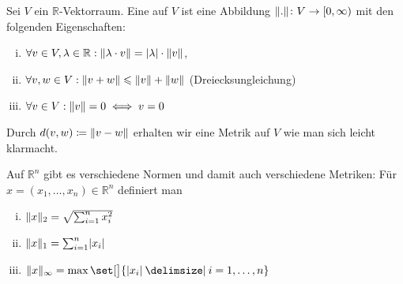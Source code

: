 \begin{definition}[{name=[Vektorraumnorm]}]
	Sei $V$ ein $\mathbb{R}$-Vektorraum.
	Eine  auf $V$ ist eine Abbildung $\Vert.\Vert \colon V \to [0,\infty)$ mit den folgenden Eigenschaften:
	\begin{enumerate}[(i)]
		\item $\forall v \in V, \lambda  \in \mathbb{R} : \Vert\lambda  \cdot v\Vert = \lvert\lambda\rvert  \cdot \Vert v\Vert$,
		\item $\forall v,w \in V : \Vert v+w\Vert \leqslant \Vert v\Vert + \Vert w\Vert$ (Dreiecksungleichung)
		\item $\forall v \in V : \Vert v\Vert = 0 \iff v=0$
	\end{enumerate}
	Durch $d(v,w) \coloneqq \Vert v-w\Vert $ erhalten wir eine Metrik auf $V$ wie man sich leicht klarmacht.
\end{definition}

\begin{beispiel}[{name=[Normen auf dem euklischen Raum]}]
	Auf $\mathbb{R}^n$ gibt es verschiedene Normen und damit auch verschiedene Metriken:
	Für $x= (x_1, \ldots ,x_n) \in \mathbb{R}^n$ definiert man
	\begin{enumerate}[(i)]
		\item $\Vert x\Vert_2 = \sqrt{\sum_{i=1}^{n} x_i^2}$
		\item $\Vert x\Vert_1  = \sum_{i=1}^{n} \lvert x_i\rvert $
		\item $\norm{x}_\infty = \max \set[\big]{\abs{x_i} \given i=1, \ldots , n}$
	\end{enumerate}
\end{beispiel}

